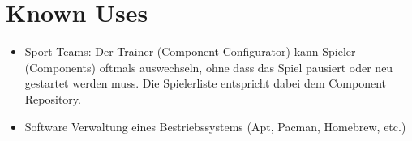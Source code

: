 \section{Known Uses}
\begin{itemize}
  \item Sport-Teams: Der Trainer (Component Configurator) kann Spieler (Components) oftmals auswechseln, ohne dass das Spiel pausiert oder neu gestartet werden muss. Die Spielerliste entspricht dabei dem Component Repository.
  \item Software Verwaltung eines Bestriebssystems (Apt, Pacman, Homebrew, etc.)
\end{itemize}


